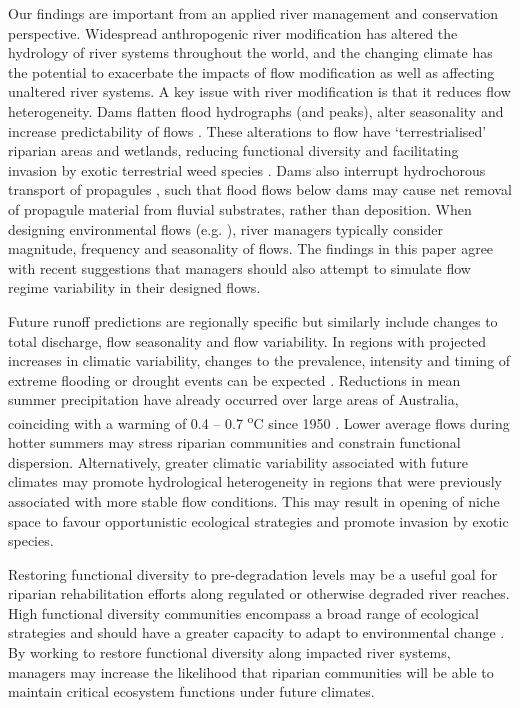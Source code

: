 Our findings are important from an applied river management and conservation perspective. Widespread anthropogenic river modification has altered the hydrology of river systems throughout the world, and the changing climate has the potential to exacerbate the impacts of flow modification as well as affecting unaltered river systems. A key issue with river modification is that it reduces flow heterogeneity. Dams flatten flood hydrographs (and peaks), alter seasonality and increase predictability of flows \citep{Graf2006, Singer2007}. These alterations to flow have ‘terrestrialised’ riparian areas and wetlands, reducing functional diversity and facilitating invasion by exotic terrestrial weed species \citep{Catford2011}.  Dams also interrupt hydrochorous transport of propagules \citep{Merritt2010a}, such that flood flows below dams may cause net removal of propagule material from fluvial substrates, rather than deposition. When designing environmental flows (e.g. \citet{Howell2000}), river managers typically consider magnitude, frequency and seasonality of flows. The findings in this paper agree with recent suggestions \citep{Naiman2008} that managers should also attempt to simulate flow regime variability in their designed flows.
 
Future runoff predictions are regionally specific but similarly include changes to total discharge, flow seasonality and flow variability. In regions with projected increases in climatic variability, changes to the prevalence, intensity and timing of extreme flooding or drought events can be expected \citep{Hennessy2008}. Reductions in mean summer precipitation have already occurred over large areas of Australia, coinciding with a warming of 0.4 – 0.7 \textsuperscript{o}C since 1950 \citep{Hennessy2007}. Lower average flows during hotter summers may stress riparian communities and constrain functional dispersion. Alternatively, greater climatic variability associated with future climates \citep{Hennessy2008} may promote hydrological heterogeneity in regions that were previously associated with more stable flow conditions. This may result in opening of niche space to favour opportunistic ecological strategies and promote invasion by exotic species.
 
Restoring functional diversity to pre-degradation levels may be a useful goal for riparian rehabilitation efforts along regulated or otherwise degraded river reaches. High functional diversity communities encompass a broad range of ecological strategies and should have a greater capacity to adapt to environmental change \citep{Tilman1997, Standish2014}. By working to restore functional diversity along impacted river systems, managers may increase the likelihood that riparian communities will be able to maintain critical ecosystem functions under future climates.
 
